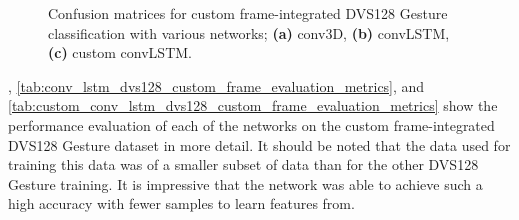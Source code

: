 \begin{figure}[htb]%
    \centering
    \qquad
    \qquad
    \caption{Confusion matrices for custom frame-integrated DVS128 Gesture classification with various networks; \textbf{(a)} conv3D, \textbf{(b)} convLSTM, \textbf{(c)} custom convLSTM.}%
    \label{fig:dvs128_custom_frame_c_matrices}%
\end{figure}

, \cref{tab:conv_lstm_dvs128_custom_frame_evaluation_metrics}, and \cref{tab:custom_conv_lstm_dvs128_custom_frame_evaluation_metrics} show the performance evaluation of each of the networks on the custom frame-integrated DVS128 Gesture dataset in more detail. It should be noted that the data used for training this data was of a smaller subset of data than for the other DVS128 Gesture training. It is impressive that the network was able to achieve such a high accuracy with fewer samples to learn features from.

